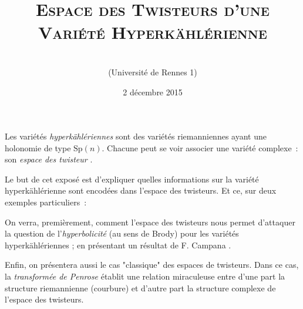 \documentclass[11pt,draft,makeidx]{article}
\title{\textsc{Espace des Twisteurs d'une Variété Hyperkählérienne}}
\date{2 décembre 2015}
\author{\name{Basile}{Pillet}\\ {\small (Université de Rennes 1)}}
\begin{document}
\maketitle
Les variétés \textit{hyperkählériennes} sont des variétés riemanniennes ayant une holonomie de type $\text{Sp}(n)$. Chacune peut se voir associer une variété complexe~: son \textit{espace des twisteur} \cite{HKLR}.

Le but de cet exposé est d'expliquer quelles informations sur la variété hyperkählérienne sont encodées dans l'espace des twisteurs. Et ce, sur deux exemples particuliers~:

On verra, premièrement, comment l'espace des twisteurs nous permet d'attaquer la question de l'\textit{hyperbolicité} (au sens de Brody) pour les variétés hyperkählériennes ; en présentant un résultat de F. Campana \cite{Campana}.

Enfin, on présentera aussi le cas "classique" des espaces de twisteurs. Dans ce cas, la \textit{transformée de Penrose} établit une relation miraculeuse entre d'une part la structure riemannienne (courbure) et d'autre part la structure complexe de l'espace des twisteurs.


\vfill



\end{document}

